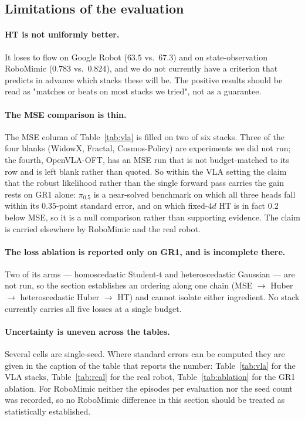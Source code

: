 \subsection{Limitations of the evaluation}
\label{sec:exp:limits}

\paragraph{HT is not uniformly better.} It loses to flow on Google Robot
($63.5$ vs.\ $67.3$) and on state-observation RoboMimic ($0.783$ vs.\ $0.824$),
and we do not currently have a criterion that predicts in advance which stacks
these will be. The positive results should be read as "matches or beats on most
stacks we tried", not as a guarantee.

\paragraph{The MSE comparison is thin.} The MSE column of
Table~\ref{tab:vla} is filled on two of six stacks. Three of the four blanks
(WidowX, Fractal, Cosmos-Policy) are experiments we did not run; the fourth,
OpenVLA-OFT, has an MSE run that is not budget-matched to its row and is left
blank rather than quoted. So within the VLA setting the claim that the robust
likelihood rather than the single forward pass carries the gain rests on GR1
alone: $\pi_{0.5}$ is a near-solved benchmark on which all three heads fall
within its $0.35$-point standard error, and on which fixed-$4d$ HT is in fact
$0.2$ below MSE, so it is a null comparison rather than supporting evidence. The
claim is carried elsewhere by RoboMimic and the real robot.

\paragraph{The loss ablation is reported only on GR1, and is incomplete there.}
Two of its arms --- homoscedastic Student-t and heteroscedastic Gaussian --- are
not run, so the section establishes an ordering along one chain
(MSE $\to$ Huber $\to$ heteroscedastic Huber $\to$ HT) and cannot isolate either
ingredient. No stack currently carries all five losses at a single budget.

\paragraph{Uncertainty is uneven across the tables.} Several cells are
single-seed. Where standard errors can be computed they are given in the
caption of the table that reports the number: Table~\ref{tab:vla} for the VLA
stacks, Table~\ref{tab:real} for the real robot, Table~\ref{tab:ablation} for
the GR1 ablation. For RoboMimic neither the episodes per evaluation nor the seed
count was recorded, so no RoboMimic difference in this section should be treated
as statistically established.
